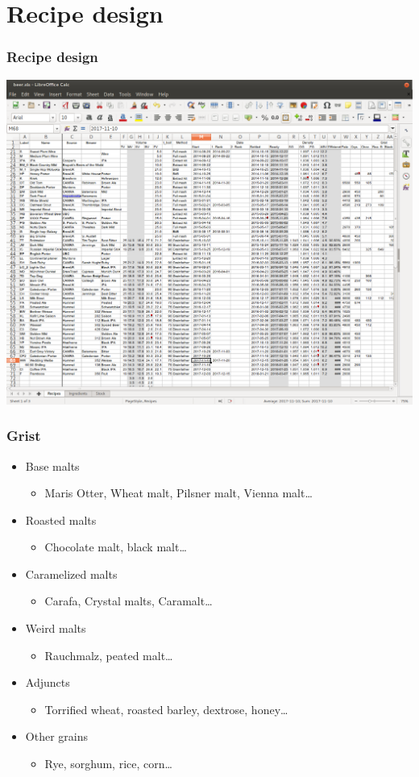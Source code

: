 \documentclass{beamer}
\begin{document}
\section{Recipe design}
\begin{frame}
  \frametitle{Recipe design}
    \includegraphics[width=\textwidth]{xls.png}
\end{frame}

\begin{frame}
  \frametitle{Grist}
  \begin{itemize}
  \item Base malts
    \begin{itemize}
    \item Maris Otter, Wheat malt, Pilsner malt, Vienna malt\ldots{}
    \end{itemize}
  \item Roasted malts
    \begin{itemize}
    \item Chocolate malt, black malt\ldots{}
    \end{itemize}
  \item Caramelized malts
    \begin{itemize}
    \item Carafa, Crystal malts, Caramalt\ldots{}
    \end{itemize}
  \item Weird malts
    \begin{itemize}
    \item Rauchmalz, peated malt\ldots{}
    \end{itemize}
    \bigskip
  \item Adjuncts
    \begin{itemize}
    \item Torrified wheat, roasted barley, dextrose, honey\ldots
    \end{itemize}
  \item Other grains
    \begin{itemize}
    \item Rye, sorghum, rice, corn\ldots
    \end{itemize}

  \end{itemize}
\end{frame}
\end{document}

